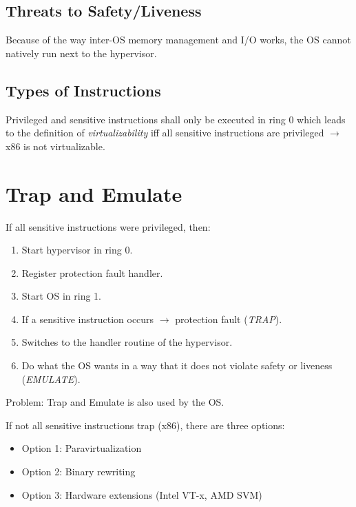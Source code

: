 \documentclass[a4paper, 11pt, accentcolor = tud3b]{tudreport}
\begin{document}
	        \subsection{Threats to Safety/Liveness}
		        Because of the way inter-OS memory management and I/O works, the OS cannot natively run next to the hypervisor.
	        
	        \subsection{Types of Instructions}
		        Privileged and sensitive instructions shall only be executed in ring 0 which leads to the definition of \textit{virtualizability} iff all sensitive instructions are privileged \(\rightarrow\) x86 is not virtualizable.

        \section{Trap and Emulate}
            If all sensitive instructions were privileged, then:
            \begin{enumerate}
            	\item Start hypervisor in ring 0.
            	\item Register protection fault handler.
            	\item Start OS in ring 1.
            	\item If a sensitive instruction occurs \(\rightarrow\) protection fault (\textit{TRAP}).
            	\item Switches to the handler routine of the hypervisor.
            	\item Do what the OS wants in a way that it does not violate safety or liveness (\textit{EMULATE}).
            \end{enumerate}
	        Problem: Trap and Emulate is also used by the OS.
	        
	        If not all sensitive instructions trap (x86), there are three options:
	        \begin{itemize}
	        	\item Option 1: Paravirtualization
	        	\item Option 2: Binary rewriting
	        	\item Option 3: Hardware extensions (Intel VT-x, AMD SVM)
	        \end{itemize}
        
\end{document}
